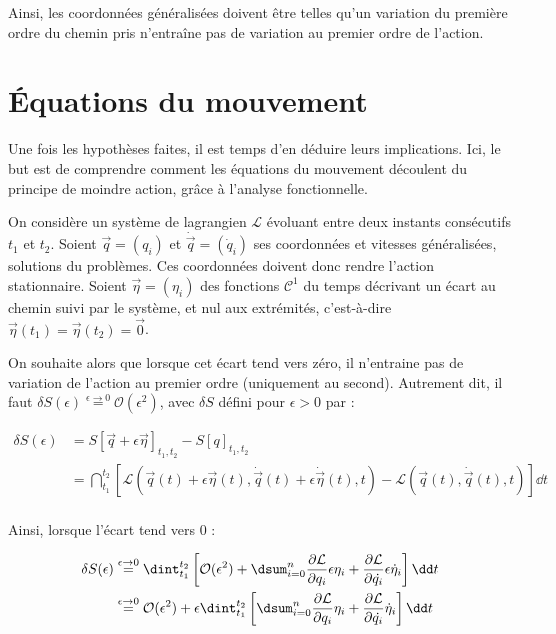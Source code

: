 Ainsi, les coordonnées généralisées doivent être telles qu'un variation du première ordre du chemin pris n’entraîne pas de variation au premier ordre de l'action.

\section{Équations du mouvement}

Une fois les hypothèses faites, il est temps d'en déduire leurs implications. Ici, le but est de comprendre comment les équations du mouvement découlent du principe de moindre action, grâce à l'analyse fonctionnelle.

On considère un système de lagrangien $\mathcal{L}$ évoluant entre deux instants consécutifs $t_1$ et $t_2$. Soient $\vec{q} = (q_i)$  et $\dot{\vec{q}} = (\dot{q}_i)$ ses coordonnées et vitesses généralisées, solutions du problèmes. Ces coordonnées doivent donc rendre l'action stationnaire. Soient $\vec{\eta} = (\eta_i)$ des fonctions $\mathcal{C}^1$ du temps décrivant un écart au chemin suivi par le système, et nul aux extrémités, c'est-à-dire $\vec{\eta}(t_1) = \vec{\eta}(t_2) = \vec{0}$.

On souhaite alors que lorsque cet écart tend vers zéro, il n'entraine pas de variation de l'action au premier ordre (uniquement au second). Autrement dit, il faut $\delta S (\epsilon) \stackrel{\epsilon \to 0}{=} \mathcal{O}(\epsilon^2)$, avec $\delta S$ défini pour $\epsilon > 0$ par :

\begin{equation}
\begin{split}
\delta S(\epsilon) & = S[\vec{q}+\epsilon \vec{\eta}]_{t_1,t_2} - S[q]_{t_1,t_2}\\
 & = \dint_{t_1}^{t_2} \left [  \mathcal{L}(\vec{q}(t) + \epsilon\vec{\eta}(t),  \dot{\vec{q}}(t) +  \epsilon\dot{\vec{\eta}}(t), t) - \mathcal{L}(\vec{q}(t),  \dot{\vec{q}}(t), t) \right ] \dd t \\
\end{split}
\end{equation}

Ainsi, lorsque l'écart tend vers 0 :

\begin{equation}
\begin{split}
\delta S(\epsilon) & \stackrel{\epsilon \to 0}{=} \dint_{t_1}^{t_2} \left [ \mathcal{O}(\epsilon^2) + \dsum_{i=0}^{n} \dfrac{\partial \mathcal{L}}{\partial q_i} \epsilon \eta_i + \dfrac{\partial \mathcal{L}}{\partial \dot{q_i}} \epsilon \dot{\eta}_i \right ] \dd t \\
& \stackrel{\epsilon \to 0}{=} \mathcal{O}(\epsilon^2) +  \epsilon  \dint_{t_1}^{t_2} \left [ \dsum_{i=0}^{n} \dfrac{\partial \mathcal{L}}{\partial q_i} \eta_i + \dfrac{\partial \mathcal{L}}{\partial \dot{q_i}}  \dot{\eta}_i  \right ] \dd t
\end{split}
\end{equation}

